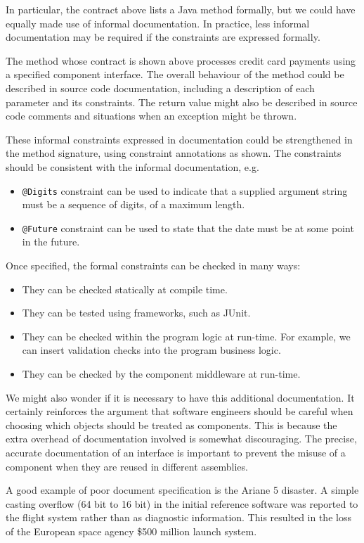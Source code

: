 \documentclass[a4paper, openany]{memoir}
\begin{document}
In particular, the contract above lists a Java method formally, but we could have equally made use of informal documentation. In practice, less informal documentation may be required if the constraints are expressed formally. 

The method whose contract is shown above processes credit card payments using a specified component interface. The overall behaviour of the method could be described in source code documentation, including a description of each parameter and its constraints. The return value might also be described in source code comments and situations when an exception might be thrown.

These informal constraints expressed in documentation could be strengthened in the method signature, using constraint annotations as shown. The constraints should be consistent with the informal documentation, e.g.
\begin{itemize}
    \item \texttt{@Digits} constraint can be used to indicate that a supplied argument string must be a sequence of digits, of a maximum length.
    \item \texttt{@Future} constraint can be used to state that the date must be at some point in the future.
\end{itemize}

Once specified, the formal constraints can be checked in many ways:
\begin{itemize}
    \item They can be checked statically at compile time.
    \item They can be tested using frameworks, such as JUnit.
    \item They can be checked within the program logic at run-time. For example, we can insert validation checks into the program business logic.
    \item They can be checked by the component middleware at run-time.
\end{itemize}

We might also wonder if it is necessary to have this additional documentation. It certainly reinforces the argument that software engineers should be careful when choosing which objects should be treated as components. This is because the extra overhead of documentation involved is somewhat discouraging. The precise, accurate documentation of an interface is important to prevent the misuse of a component when they are reused in different assemblies.

A good example of poor document specification is the Ariane 5 disaster. A simple casting overflow (64 bit to 16 bit) in the initial reference software was reported to the flight system rather than as diagnostic information. This resulted in the loss of the European space agency \$500 million launch system.
\end{document}
